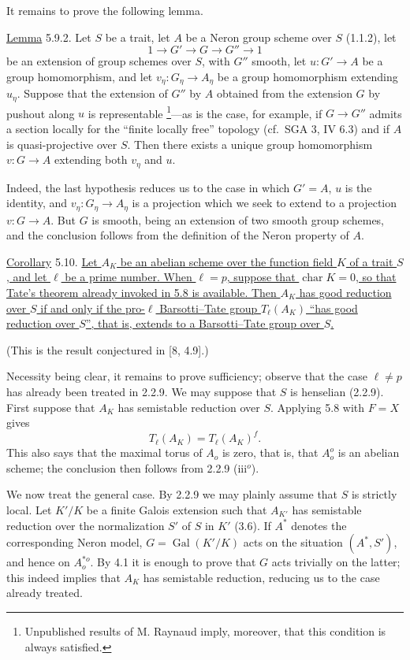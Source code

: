 It remains to prove the following lemma.

\medskip
\noindent
\underline{Lemma} 5.9.2. Let $S$ be a trait, let $A$ be
a Neron group scheme over $S$ (1.1.2), let
\[
 1\longrightarrow G'\longrightarrow G\longrightarrow G''
 \longrightarrow1
\]
be an extension of group schemes over $S$, with $G''$ smooth, let
$u:G'\longrightarrow A$ be a group homomorphism, and let
$v_\eta:G_\eta\longrightarrow A_\eta$ be a group homomorphism
extending $u_\eta$. Suppose that the extension of $G''$ by $A$
obtained from the extension $G$ by pushout along $u$ is representable
\footnote{Unpublished results of M. Raynaud imply, moreover, that this
condition is always satisfied.}---as is the case, for example, if
$G\longrightarrow G''$ admits a section locally for the ``finite
locally free'' topology (cf.\ SGA 3, IV 6.3) and if $A$ is
quasi-projective over $S$. Then there exists a unique group
homomorphism $v:G\longrightarrow A$ extending both $v_\eta$ and $u$.

Indeed, the last hypothesis reduces us to the case in which $G'=A$,
$u$ is the identity, and $v_\eta:G_\eta\longrightarrow A_\eta$ is a
projection which we seek to extend to a projection
$v:G\longrightarrow A$. But $G$ is smooth, being an extension of two
smooth group schemes, and the conclusion follows from the definition
of the Neron property of $A$.

\medskip
\noindent
\underline{Corollary} 5.10. \underline{Let $A_K$ be an abelian
scheme over the function field $K$ of a trait $S$, and let $\ell$ be
a prime number. When $\ell=p$, suppose that
$\operatorname{char}K=0$, so that Tate's theorem already invoked in
5.8 is available. Then $A_K$ has good reduction over $S$ if and only
if the pro-$\ell$ Barsotti--Tate group $T_\ell(A_K)$ ``has good
reduction over $S$'', that is, extends to a Barsotti--Tate group over
$S$.}

(This is the result conjectured in [8, 4.9].)

Necessity being clear, it remains to prove sufficiency; observe that
the case $\ell\neq p$ has already been treated in 2.2.9. We may
suppose that $S$ is henselian (2.2.9). First suppose that $A_K$ has
semistable reduction over $S$. Applying 5.8 with $F=X$ gives
\[
 T_\ell(A_K)=T_\ell(A_K)^f.
\]
This also says that the maximal torus of $A_o$ is zero, that is, that
$A_o^o$ is an abelian scheme; the conclusion then follows from
2.2.9 (iii${}^o$).

We now treat the general case. By 2.2.9 we may plainly assume that
$S$ is strictly local. Let $K'/K$ be a finite Galois extension such
that $A_{K'}$ has semistable reduction over the normalization $S'$ of
$S$ in $K'$ (3.6). If $A^*$ denotes the corresponding Neron model,
$G=\operatorname{Gal}(K'/K)$ acts on the situation $(A^*,S')$, and
hence on $A_o^{*o}$. By 4.1 it is enough to prove that $G$ acts
trivially on the latter; this indeed implies that $A_K$ has
semistable reduction, reducing us to the case already treated.

